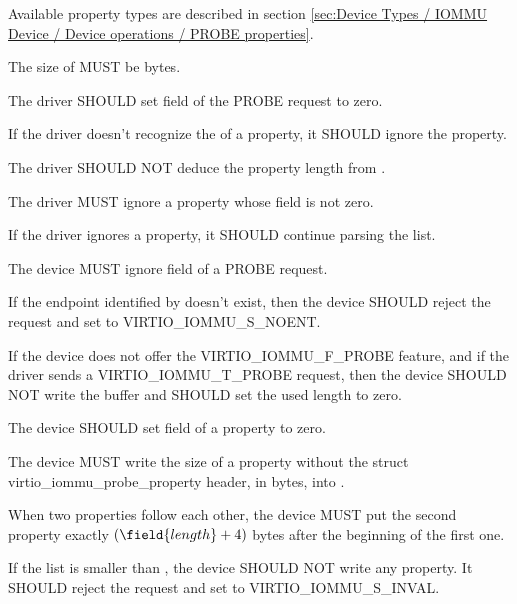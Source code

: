 Available property types are described in section
\ref{sec:Device Types / IOMMU Device / Device operations / PROBE properties}.


The size of  MUST be  bytes.

The driver SHOULD set field  of the PROBE request to zero.

If the driver doesn't recognize the  of a property, it SHOULD
ignore the property.

The driver SHOULD NOT deduce the property length from .

The driver MUST ignore a property whose  field is not
zero.

If the driver ignores a property, it SHOULD continue parsing the list.


The device MUST ignore field  of a PROBE request.

If the endpoint identified by  doesn't exist, then the
device SHOULD reject the request and set  to
VIRTIO_IOMMU_S_NOENT.

If the device does not offer the VIRTIO_IOMMU_F_PROBE feature, and if the
driver sends a VIRTIO_IOMMU_T_PROBE request, then the device SHOULD NOT
write the buffer and SHOULD set the used length to zero.

The device SHOULD set field  of a property to zero.

The device MUST write the size of a property without the struct
virtio_iommu_probe_property header, in bytes, into .

When two properties follow each other, the device MUST put the second
property exactly $(\field{length} + 4)$ bytes after the beginning of the
first one.

If the  list is smaller than , the
device SHOULD NOT write any property. It SHOULD reject the request and set
 to VIRTIO_IOMMU_S_INVAL.


